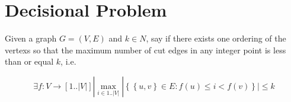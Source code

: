 \section{Decisional Problem}
Given a graph $G = (V, E)$ and $k \in N$, say if there exists
one ordering of the vertexs
so that the maximum number of cut edges 
in any integer point is less than or equal $k$, i.e.

\[
\exists f : V \rightarrow [1..|V| ]  |
\max_{i \in 1..|V|}
  |
  \left \{
    \left \{
      u, v
    \right \} 
    \in E : f (u) \leq i < f (v)
  \right \}
  | \leq k
\]

